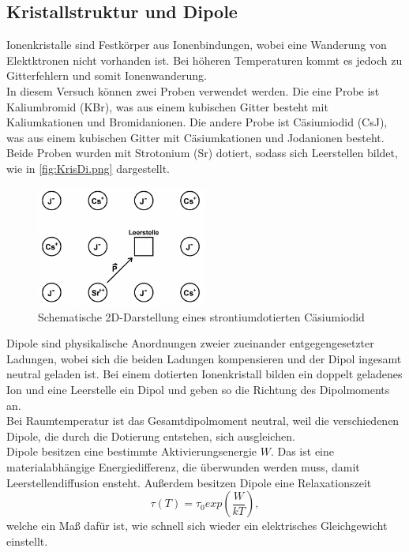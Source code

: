 \subsection{Kristallstruktur und Dipole}
\label{subsec:KriDi}
Ionenkristalle sind Festkörper aus Ionenbindungen, wobei eine Wanderung von Elektktronen nicht vorhanden
ist. Bei höheren Temperaturen kommt es jedoch zu Gitterfehlern und somit Ionenwanderung.\\
In diesem Versuch können zwei Proben verwendet werden. Die eine Probe ist Kaliumbromid (KBr), was aus einem kubischen Gitter
besteht mit Kaliumkationen und Bromidanionen. Die andere Probe ist Cäsiumiodid (CsJ), was aus einem kubischen
Gitter mit Cäsiumkationen und Jodanionen besteht. Beide Proben wurden mit Strotonium (Sr) dotiert, sodass sich
Leerstellen bildet, wie in \autoref{fig:KrisDi.png} dargestellt.
\begin{figure}[H]
    \centering
    \includegraphics[width=0.5\textwidth]{Abbildungen/KrisDi.png}
    \caption {Schematische 2D-Darstellung eines strontiumdotierten Cäsiumiodid}
    \label{fig:KrisDi.png}
\end{figure}
Dipole sind physikalische Anordnungen zweier zueinander entgegengesetzter Ladungen, wobei sich die beiden Ladungen
kompensieren und der Dipol ingesamt neutral geladen ist.
Bei einem dotierten Ionenkristall bilden ein doppelt geladenes Ion und eine Leerstelle ein Dipol und geben so die 
Richtung des Dipolmoments an.\\
Bei Raumtemperatur ist das Gesamtdipolmoment neutral, weil die verschiedenen Dipole, die durch die Dotierung 
entstehen, sich ausgleichen.\\
Dipole besitzen eine bestimmte Aktivierungsenergie $W$. Das ist eine materialabhängige Energiedifferenz, die 
überwunden werden muss, damit Leerstellendiffusion ensteht.
Außerdem besitzen Dipole eine Relaxationszeit
\begin{equation}
    \tau(T) = \tau_0 exp(\frac{W}{k T}),
    \label{eqn:Relaxationszeit}
\end{equation}
welche ein Maß dafür ist, wie schnell sich wieder ein elektrisches Gleichgewicht einstellt.\\
